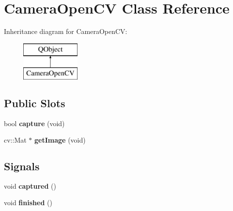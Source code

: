 \hypertarget{class_camera_open_c_v}{}\section{Camera\+Open\+C\+V Class Reference}
\label{class_camera_open_c_v}
Inheritance diagram for Camera\+Open\+C\+V\+:\begin{figure}[H]
\begin{center}
\leavevmode
\includegraphics[height=2.000000cm]{class_camera_open_c_v}
\end{center}
\end{figure}
\subsection*{Public Slots}
\begin{DoxyCompactItemize}
\item 
\hypertarget{class_camera_open_c_v_ac3835c145a33eb30d52fe11c3a226aef}{}bool {\bfseries capture} (void)\label{class_camera_open_c_v_ac3835c145a33eb30d52fe11c3a226aef}

\item 
\hypertarget{class_camera_open_c_v_a319723113eebfc9f844176fc40d03429}{}cv\+::\+Mat $\ast$ {\bfseries get\+Image} (void)\label{class_camera_open_c_v_a319723113eebfc9f844176fc40d03429}

\end{DoxyCompactItemize}
\subsection*{Signals}
\begin{DoxyCompactItemize}
\item 
\hypertarget{class_camera_open_c_v_a5efd166aa1423d798dc501a31da0cdec}{}void {\bfseries captured} ()\label{class_camera_open_c_v_a5efd166aa1423d798dc501a31da0cdec}

\item 
\hypertarget{class_camera_open_c_v_ab71fb7050b5a1b42eae2239100612bd3}{}void {\bfseries finished} ()\label{class_camera_open_c_v_ab71fb7050b5a1b42eae2239100612bd3}

\end{DoxyCompactItemize}
